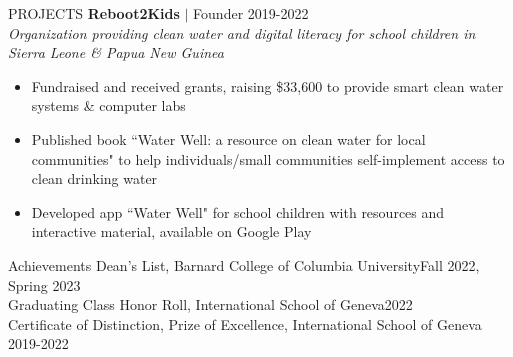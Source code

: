 \documentclass{resume} %
\begin{document}
\begin{rSection}{PROJECTS}
{ \textbf{Reboot2Kids} $\vert$ Founder} \hfill 2019-2022\\ 
\textit{Organization providing clean water and digital literacy for school children in Sierra Leone \& Papua New Guinea}
\vspace{-0.6em}
\begin{itemize}
\item Fundraised and received grants, raising \$33,600 to provide smart clean water systems \& computer labs
\vspace{-0.4em}
\item Published book ``Water Well: a resource on clean water for local communities" to help individuals/small communities self-implement access to clean drinking water
\vspace{-0.4em}
\item Developed app ``Water Well" for school children with resources and interactive material, available on Google Play
\end{itemize}

\end{rSection}

\vspace{-0.2em}
\begin{rSection}{Achievements}
{Dean's List, Barnard College of Columbia University}\hfill Fall 2022, Spring 2023\\
{Graduating Class Honor Roll, International School of Geneva}\hfill 2022\\
{Certificate of Distinction, Prize of Excellence, International School of Geneva} \hfill 2019-2022\\

\end{rSection}


\end{document}
